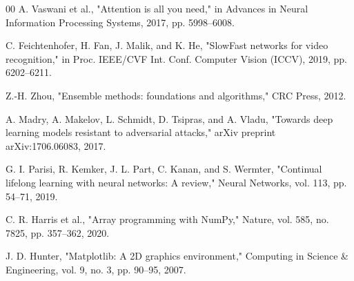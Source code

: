 \documentclass[conference]{IEEEtran}
\begin{document}
\begin{thebibliography}{00}
 A. Vaswani et al., "Attention is all you need," in Advances in Neural Information Processing Systems, 2017, pp. 5998–6008.

 C. Feichtenhofer, H. Fan, J. Malik, and K. He, "SlowFast networks for video recognition," in Proc. IEEE/CVF Int. Conf. Computer Vision (ICCV), 2019, pp. 6202–6211.

 Z.-H. Zhou, "Ensemble methods: foundations and algorithms," CRC Press, 2012.

 A. Madry, A. Makelov, L. Schmidt, D. Tsipras, and A. Vladu, "Towards deep learning models resistant to adversarial attacks," arXiv preprint arXiv:1706.06083, 2017.

 G. I. Parisi, R. Kemker, J. L. Part, C. Kanan, and S. Wermter, "Continual lifelong learning with neural networks: A review," Neural Networks, vol. 113, pp. 54–71, 2019.

 C. R. Harris et al., "Array programming with NumPy," Nature, vol. 585, no. 7825, pp. 357–362, 2020.

 J. D. Hunter, "Matplotlib: A 2D graphics environment," Computing in Science \& Engineering, vol. 9, no. 3, pp. 90–95, 2007.
\end{thebibliography}
\end{document}
